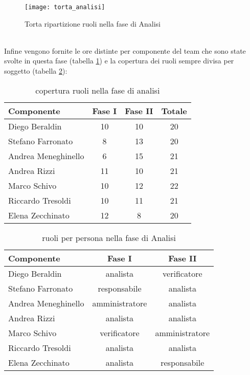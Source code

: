 \begin{figure}[h!]
\centering
  \texttt{[image: torta\_analisi]}
\caption{Torta ripartizione ruoli nella fase di Analisi}\label{fig:ruolian}
\end{figure}\\
\clearpage
Infine vengono fornite le ore distinte per componente del team che sono state svolte in questa fase (tabella \ref{tab:ruolian2}) e la copertura dei ruoli sempre divisa per soggetto (tabella \ref{tab:ruolian3}):\\
\begin{table}[h!]
\centering
\begin{tabular}{|l|c|c|c|}
\hline
Componente& Fase I& Fase II& Totale\\
\hline
Diego Beraldin &10 &10 & 20\\
Stefano Farronato & 8& 13& 20\\
Andrea Meneghinello & 6& 15& 21\\
Andrea Rizzi & 11& 10& 21\\
Marco Schivo & 10& 12& 22\\
Riccardo Tresoldi & 10& 11& 21\\
Elena Zecchinato & 12& 8& 20\\
\hline
\end{tabular}
\caption{copertura ruoli nella fase di analisi}\label{tab:ruolian2}
\end{table}
\begin{table}[h!]
\centering
\begin{tabular}{|l|c|c|}
\hline
Componente& Fase I&Fase II\\
\hline
Diego Beraldin & analista&verificatore\\
Stefano Farronato & responsabile&analista\\
Andrea Meneghinello & amministratore&analista\\
Andrea Rizzi &  analista&analista\\
Marco Schivo & verificatore&amministratore\\
Riccardo Tresoldi & analista&analista\\
Elena Zecchinato & analista&responsabile\\
\hline
\end{tabular}
\caption{ruoli per persona nella fase di Analisi}\label{tab:ruolian3}
\end{table}


\clearpage
